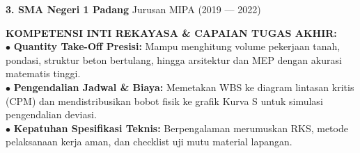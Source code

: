 \documentclass[10pt,a4paper,landscape]{article}
\begin{document}
\begin{minipage}[t]{0.58\linewidth}
\begin{tcolorbox}[sharp corners, boxrule=0.8pt, colframe=pborder, colback=white, left=3.5mm, right=3.5mm, top=2.5mm, bottom=2.5mm, height=100mm]
    {\fontsize{7.8pt}{9.2pt}\selectfont\bfseries\color{pnavy}3. SMA Negeri 1 Padang} \hfill {\fontsize{6.8pt}{8pt}\selectfont\color{pmuted}Jurusan MIPA (2019 --- 2022)}
  \end{tcolorbox}
  \vspace{2mm}

  \begin{tcolorbox}[sharp corners, boxrule=0.6pt, colframe=pnavy, colback=pbglight, left=3.5mm, right=3.5mm, top=2.5mm, bottom=2.5mm, height=52mm]
    {\fontsize{7.2pt}{8.5pt}\selectfont\bfseries\color{pnavy}KOMPETENSI INTI REKAYASA \& CAPAIAN TUGAS AKHIR:}\\[1.5mm]
    {\fontsize{6.8pt}{8.8pt}\selectfont\color{psteel}
    $\bullet$ \textbf{Quantity Take-Off Presisi:} Mampu menghitung volume pekerjaan tanah, pondasi, struktur beton bertulang, hingga arsitektur dan MEP dengan akurasi matematis tinggi.\\
    $\bullet$ \textbf{Pengendalian Jadwal \& Biaya:} Memetakan WBS ke diagram lintasan kritis (CPM) dan mendistribusikan bobot fisik ke grafik Kurva S untuk simulasi pengendalian deviasi.\\
    $\bullet$ \textbf{Kepatuhan Spesifikasi Teknis:} Berpengalaman merumuskan RKS, metode pelaksanaan kerja aman, dan checklist uji mutu material lapangan.
    }
  \end{tcolorbox}
\end{minipage}%
\hfill
\end{document}
